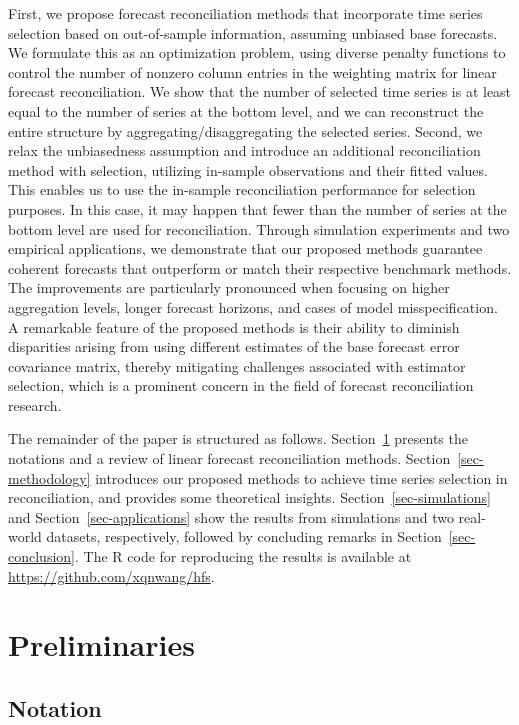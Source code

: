 \documentclass[
  11pt]{article}
\theoremstyle{plain}
\theoremstyle{remark}
\begin{document}
First, we propose forecast reconciliation methods that incorporate time
series selection based on out-of-sample information, assuming unbiased
base forecasts. We formulate this as an optimization problem, using
diverse penalty functions to control the number of nonzero column
entries in the weighting matrix for linear forecast reconciliation. We
show that the number of selected time series is at least equal to the
number of series at the bottom level, and we can reconstruct the entire
structure by aggregating/disaggregating the selected series. Second, we
relax the unbiasedness assumption and introduce an additional
reconciliation method with selection, utilizing in-sample observations
and their fitted values. This enables us to use the in-sample
reconciliation performance for selection purposes. In this case, it may
happen that fewer than the number of series at the bottom level are used
for reconciliation. Through simulation experiments and two empirical
applications, we demonstrate that our proposed methods guarantee
coherent forecasts that outperform or match their respective benchmark
methods. The improvements are particularly pronounced when focusing on
higher aggregation levels, longer forecast horizons, and cases of model
misspecification. A remarkable feature of the proposed methods is their
ability to diminish disparities arising from using different estimates
of the base forecast error covariance matrix, thereby mitigating
challenges associated with estimator selection, which is a prominent
concern in the field of forecast reconciliation research.

The remainder of the paper is structured as follows.
Section~\ref{sec-preliminaries} presents the notations and a review of
linear forecast reconciliation methods. Section~\ref{sec-methodology}
introduces our proposed methods to achieve time series selection in
reconciliation, and provides some theoretical insights.
Section~\ref{sec-simulations} and Section~\ref{sec-applications} show
the results from simulations and two real-world datasets, respectively,
followed by concluding remarks in Section~\ref{sec-conclusion}. The R
code for reproducing the results is available at
\url{https://github.com/xqnwang/hfs}.

\section{Preliminaries}\label{sec-preliminaries}

\subsection{Notation}\label{notation}
\end{document}
